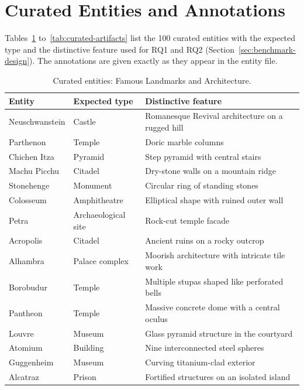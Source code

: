  \section{Curated Entities and Annotations}
\label{sec:curated-list}

Tables~\ref{tab:curated-landmarks} to~\ref{tab:curated-artifacts} list the 100
curated entities with the expected type and the distinctive feature used for RQ1
and RQ2 (Section~\ref{sec:benchmark-design}). The annotations are given exactly as
they appear in the entity file.


\begin{table}[p]
\centering
\small
\caption{Curated entities: Famous Landmarks and Architecture.}
\label{tab:curated-landmarks}
\begin{tabular}{@{}p{}p{}p{}@{}}
\toprule
Entity & Expected type & Distinctive feature\tabularnewline
\midrule
\raggedright Neuschwanstein & \raggedright Castle & \raggedright Romanesque Revival architecture on a rugged hill\tabularnewline
\raggedright Parthenon & \raggedright Temple & \raggedright Doric marble columns\tabularnewline
\raggedright Chichen Itza & \raggedright Pyramid & \raggedright Step pyramid with central stairs\tabularnewline
\raggedright Machu Picchu & \raggedright Citadel & \raggedright Dry-stone walls on a mountain ridge\tabularnewline
\raggedright Stonehenge & \raggedright Monument & \raggedright Circular ring of standing stones\tabularnewline
\raggedright Colosseum & \raggedright Amphitheatre & \raggedright Elliptical shape with ruined outer wall\tabularnewline
\raggedright Petra & \raggedright Archaeological site & \raggedright Rock-cut temple facade\tabularnewline
\raggedright Acropolis & \raggedright Citadel & \raggedright Ancient ruins on a rocky outcrop\tabularnewline
\raggedright Alhambra & \raggedright Palace complex & \raggedright Moorish architecture with intricate tile work\tabularnewline
\raggedright Borobudur & \raggedright Temple & \raggedright Multiple stupas shaped like perforated bells\tabularnewline
\raggedright Pantheon & \raggedright Temple & \raggedright Massive concrete dome with a central oculus\tabularnewline
\raggedright Louvre & \raggedright Museum & \raggedright Glass pyramid structure in the courtyard\tabularnewline
\raggedright Atomium & \raggedright Building & \raggedright Nine interconnected steel spheres\tabularnewline
\raggedright Guggenheim & \raggedright Museum & \raggedright Curving titanium-clad exterior\tabularnewline
\raggedright Alcatraz & \raggedright Prison & \raggedright Fortified structures on an isolated island\tabularnewline

\end{tabular}
\end{table}
